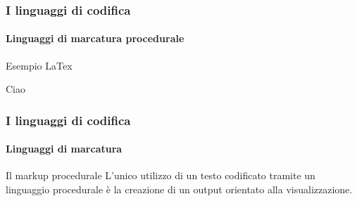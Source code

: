 \documentclass{beamer}
\begin{document}
\begin{frame}
	\frametitle{I linguaggi di codifica}
	\framesubtitle{Linguaggi di marcatura procedurale}
	\addtocounter{nframe}{1}

	\begin{block}{Esempio LaTex}
        \begin{tiny}
            Ciao
		\end{tiny}
	\end{block}

\end{frame}

\begin{frame}
	\frametitle{I linguaggi di codifica}
	\framesubtitle{Linguaggi di marcatura}
	\addtocounter{nframe}{1}

	\begin{block}{Il markup procedurale}
		L’unico utilizzo di un testo codificato tramite un linguaggio procedurale è la creazione di un output orientato alla visualizzazione.
	\end{block}
\end{frame}
\end{document}
